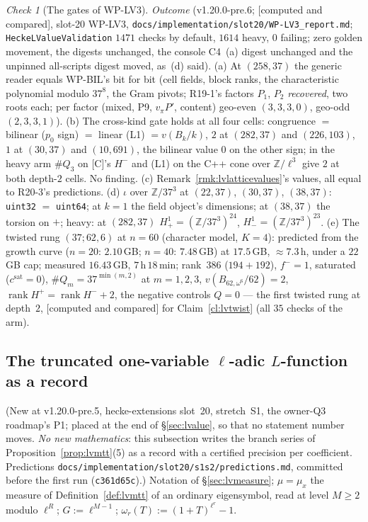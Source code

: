 \documentclass[11pt]{article}
\theoremstyle{remark}
\newtheorem{checkitem}[theorem]{Check}
\newcommand{\Z}{\mathbb{Z}}
\DeclareMathOperator{\rank}{rank}
\newcommand{\CMPD}{\textsf{[computed and compared]}}   %
\begin{document}
\begin{checkitem}[The gates of WP-LV3]
\emph{Outcome} (v1.20.0-pre.6; \CMPD, slot-20 WP-LV3, \texttt{docs/\allowbreak implementation/\allowbreak slot20/\allowbreak WP-LV3\_report.md}; \texttt{Heck\allowbreak eLValue\allowbreak Validation} $1471$ checks by default, $1614$ heavy, $0$ failing; zero golden
movement, the digests unchanged, the console C4~(a) digest unchanged and the unpinned all-scripts digest moved, as~(d) said). (a) At $(258,37)$ the generic reader equals WP-BIL's bit for bit (cell
fields, block ranks, the characteristic polynomial modulo $37^{8}$, the Gram pivots; R19-1's factors $P_1$, $P_2$ \emph{recovered}, two roots each; per factor (mixed, P9, $v_\pi P'$, content) geo-even
$(3,3,3,0)$, geo-odd $(2,3,3,1)$). (b) The cross-kind gate holds at all four cells: congruence $=$ bilinear ($p_0$ sign) $=$ linear (L1) $=v(B_k/k)$, $2$ at $(282,37)$ and $(226,103)$, $1$ at
$(30,37)$ and $(10,691)$, the bilinear value $0$ on the other sign; in the heavy arm $\#Q_3$ on [C]'s $H^{-}$ and (L1) on the C++ cone over $\Z/\ell^{3}$ give $2$ at both depth-$2$ cells. No finding.
(c) Remark~\ref{rmk:lvlatticevalues}'s values, all equal to R20-3's predictions. (d) $\iota$ over $\Z/37^{3}$ at $(22,37)$, $(30,37)$, $(38,37)$: \texttt{uint32} $=$ \texttt{uint64}; at $k=1$ the field
object's dimensions; at $(38,37)$ the torsion on $+$; heavy: at $(282,37)$ $H^{1}_{+}=(\Z/37^{3})^{24}$, $H^{1}_{-}=(\Z/37^{3})^{23}$. (e) The twisted rung $(37;62,6)$ at $n=60$ (character model, $K=4$):
predicted from the growth curve ($n=20$: $2.10$\,GB; $n=40$: $7.48$\,GB) at $17.5$\,GB, $\approx7.3$\,h, under a $22$\,GB cap; measured $16.43$\,GB, $7$\,h\,$18$\,min; rank~$386$ ($194+192$),
$f^{-}=1$, saturated ($c^{\mathrm{sat}}=0$), $\#Q_m=37^{\min(m,2)}$ at $m=1,2,3$, $v(B_{62,\omega^{6}}/62)=2$, $\rank H^{+}=\rank H^{-}+2$, the negative controls $Q=0$ --- the first twisted rung at
depth~$2$, \CMPD{} for Claim~\ref{cl:lvtwist} (all $35$ checks of the arm).
\end{checkitem}

\subsection{The truncated one-variable \texorpdfstring{$\ell$}{l}-adic \texorpdfstring{$L$}{L}-function as a record}\label{sec:lvlfunction}
(New at v1.20.0-pre.5, hecke-extensions slot~20, stretch~S1, the owner-Q3 roadmap's P1; placed at the end of \S\ref{sec:lvalue}, so that no statement number moves. \emph{No new
mathematics}: this subsection writes the branch series of Proposition~\ref{prop:lvmtt}(5) as a record with a certified precision per coefficient. Predictions
\texttt{docs/implementation/slot20/s1s2/predictions.md}, committed before the first run (\texttt{c361d65c}).) Notation of \S\ref{sec:lvmeasure}; $\mu=\mu_x$ the measure of
Definition~\ref{def:lvmtt} of an ordinary eigensymbol, read at level $M\ge2$ modulo $\ell^{R}$; $G:=\ell^{M-1}$; $\omega_r(T):=(1+T)^{\ell^{r}}-1$.
\end{document}
